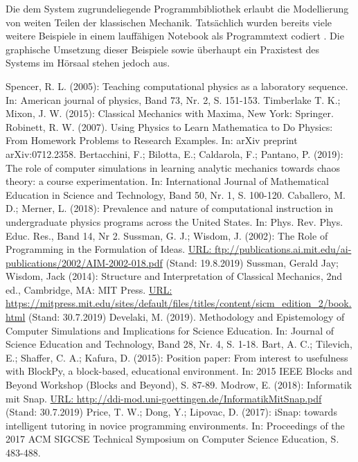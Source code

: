 \documentclass[twocolumn, 10pt]{article}
\begin{document}
Die dem System zugrundeliegende Programmbibliothek erlaubt die Modellierung von weiten Teilen der klassischen Mechanik. Tatsächlich wurden bereits viele weitere Beispiele in einem lauffähigen Notebook als Programmtext codiert \cite{cNextJ 24}. Die graphische Umsetzung dieser Beispiele sowie überhaupt ein Praxistest des Systems im Hörsaal stehen jedoch aus.

\begin{thebibliography}{999}
Spencer, R. L. (2005): Teaching computational physics as a laboratory sequence. In: American journal of physics, Band 73, Nr. 2, S. 151-153.
Timberlake T. K.; Mixon, J. W. (2015): Classical Mechanics with Maxima, New York: Springer.
Robinett, R. W. (2007). Using Physics to Learn Mathematica to Do Physics: From Homework Problems to Research Examples. In: arXiv preprint arXiv:0712.2358.
Bertacchini, F.; Bilotta, E.; Caldarola, F.; Pantano, P. (2019): The role of computer simulations in learning analytic mechanics towards chaos theory: a course experimentation. In: International Journal of Mathematical Education in Science and Technology, Band 50, Nr. 1, S. 100-120.
Caballero, M. D.; Merner, L. (2018): Prevalence and nature of computational instruction in undergraduate physics programs across the United States. In: Phys. Rev. Phys. Educ. Res., Band 14, Nr 2.
Sussman, G. J.; Wisdom, J. (2002): The Role of Programming in the Formulation of Ideas. \url{URL: ftp://publications.ai.mit.edu/ai-publications/2002/AIM-2002-018.pdf} (Stand: 19.8.2019)
Sussman, Gerald Jay; Wisdom, Jack (2014): Structure and Interpretation of Classical Mechanics, 2nd ed., Cambridge, MA: MIT Press. \url{URL: https://mitpress.mit.edu/sites/default/files/titles/content/sicm_edition_2/book.html} (Stand: 30.7.2019)
Develaki, M. (2019). Methodology and Epistemology of Computer Simulations and Implications for Science Education. In: Journal of Science Education and Technology, Band 28, Nr. 4, S. 1-18.
Bart, A. C.; Tilevich, E.; Shaffer, C. A.; Kafura, D. (2015): Position paper: From interest to usefulness with BlockPy, a block-based, educational environment. In: 2015 IEEE Blocks and Beyond Workshop (Blocks and Beyond), S. 87-89.
Modrow, E. (2018): Informatik mit Snap. \url{URL: http://ddi-mod.uni-goettingen.de/InformatikMitSnap.pdf} (Stand: 30.7.2019)
Price, T. W.; Dong, Y.; Lipovac, D. (2017): iSnap: towards intelligent tutoring in novice programming environments. In: Proceedings of the 2017 ACM SIGCSE Technical Symposium on Computer Science Education, S. 483-488.


\end{thebibliography}
\end{document}
